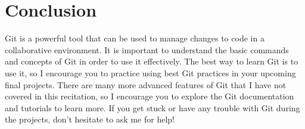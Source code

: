 \documentclass[fleqn]{article}
\begin{document}
\section*{Conclusion}

Git is a powerful tool that can be used to manage changes to code in a
collaborative environment. It is important to understand the basic commands
and concepts of Git in order to use it effectively. The best way to learn Git
is to use it, so I encourage you to practice using best Git practices in your
upcoming final projects. There are many more advanced features of Git that I
have not covered in this recitation, so I encourage you to explore the Git
documentation and tutorials to learn more. If you get stuck or have any trouble
with Git during the projects, don't hesitate to ask me for help!
\end{document}
